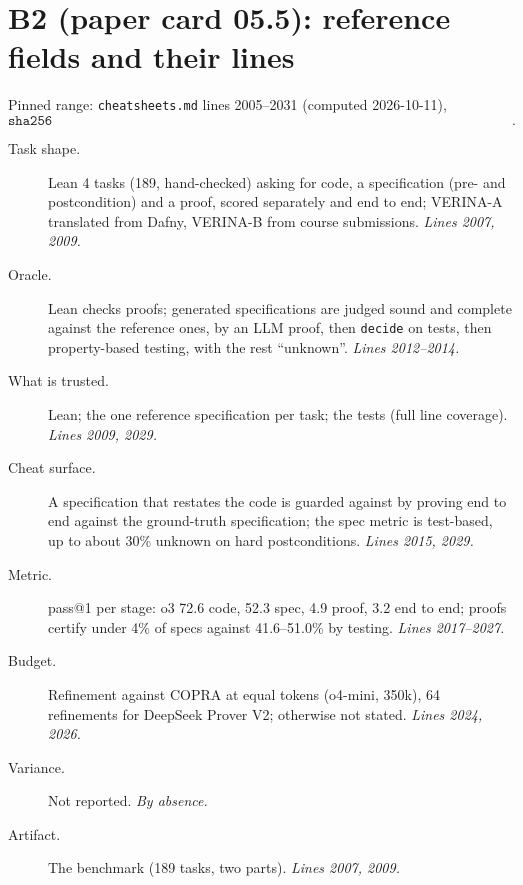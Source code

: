 \documentclass[11pt]{article}
\begin{document}
\section*{B2 (paper card 05.5): reference fields and their lines}

Pinned range: \texttt{cheatsheets.md} lines 2005--2031 (computed 2026-10-11),
\[ \texttt{sha256 6c9b00d83e072910f2c5c6a2a298646045a89ffae04a90bdc0821436413f67f0}. \]

\begin{description}
\item[Task shape.] Lean 4 tasks (189, hand-checked) asking for code, a
  specification (pre- and postcondition) and a proof, scored separately and
  end to end; VERINA-A translated from Dafny, VERINA-B from course
  submissions. \emph{Lines 2007, 2009.}
\item[Oracle.] Lean checks proofs; generated specifications are judged sound
  and complete against the reference ones, by an LLM proof, then
  \texttt{decide} on tests, then property-based testing, with the rest
  ``unknown''. \emph{Lines 2012--2014.}
\item[What is trusted.] Lean; the one reference specification per task; the
  tests (full line coverage). \emph{Lines 2009, 2029.}
\item[Cheat surface.] A specification that restates the code is guarded
  against by proving end to end against the ground-truth specification; the
  spec metric is test-based, up to about 30\% unknown on hard postconditions.
  \emph{Lines 2015, 2029.}
\item[Metric.] pass@1 per stage: o3 72.6 code, 52.3 spec, 4.9 proof, 3.2 end
  to end; proofs certify under 4\% of specs against 41.6--51.0\% by testing.
  \emph{Lines 2017--2027.}
\item[Budget.] Refinement against COPRA at equal tokens (o4-mini, 350k), 64
  refinements for DeepSeek Prover V2; otherwise not stated. \emph{Lines
  2024, 2026.}
\item[Variance.] Not reported. \emph{By absence.}
\item[Artifact.] The benchmark (189 tasks, two parts). \emph{Lines 2007,
  2009.}
\end{description}
\end{document}
